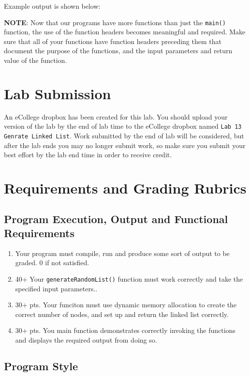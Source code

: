 \documentclass[11pt]{article}
\begin{document}
Example output is shown below: 



\textbf{NOTE}: Now that our programs have more functions than just the
\verb~main()~ function, the use of the function headers becomes meaningful
and required.  Make sure that all of your functions have function
headers preceding them that document the purpose of the functions, and
the input parameters and return value of the function.
\section*{Lab Submission}
\label{sec-4}


An eCollege dropbox has been created for this lab.  You should upload
your version of the lab by the end of lab time to the eCollege dropbox
named \verb~Lab 13 Genrate Linked List~.  Work submitted by the end of
lab will be considered, but after the lab ends you may no longer
submit work, so make sure you submit your best effort by the lab end
time in order to receive credit.
\section*{Requirements and Grading Rubrics}
\label{sec-5}
\subsection*{Program Execution, Output and Functional Requirements}
\label{sec-5-1}


\begin{enumerate}
\item Your program must compile, run and produce some sort of output to be
  graded. 0 if not satisfied.
\item 40+ Your \verb~generateRandomList()~ function must work correctly and take the
   specified input parameters..
\item 30+ pts.  Your funciton must use dynamic memory allocation to create the
   correct number of nodes, and set up and return the linked list correctly.
\item 30+ pts. You main function demonstrates correctly invoking the functions
   and displays the required output from doing so.
\end{enumerate}
\subsection*{Program Style}
\label{sec-5-2}
\end{document}
